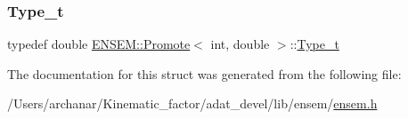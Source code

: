 \subsubsection{\texorpdfstring{Type\_t}{Type\_t}\hspace{0.1cm}{\footnotesize\ttfamily [2/2]}}
{\footnotesize\ttfamily typedef double \mbox{\hyperlink{structENSEM_1_1Promote}{E\+N\+S\+E\+M\+::\+Promote}}$<$ int, double $>$\+::\mbox{\hyperlink{structENSEM_1_1Promote_3_01int_00_01double_01_4_a9336b13a291d56af90484918a2f0ebe5}{Type\+\_\+t}}}



The documentation for this struct was generated from the following file\+:\begin{DoxyCompactItemize}
\item 
/\+Users/archanar/\+Kinematic\+\_\+factor/adat\+\_\+devel/lib/ensem/\mbox{\hyperlink{lib_2ensem_2ensem_8h}{ensem.\+h}}\end{DoxyCompactItemize}

